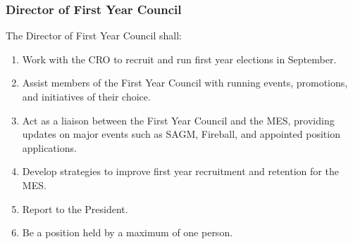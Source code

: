 
\subsubsection{Director of First Year Council}
\label{director-first-year-council}
The Director of First Year Council shall:

\begin{enumerate}
 \item
  Work with the CRO to recruit and run first year elections in September.
 \item
  Assist members of the First Year Council with running events, promotions, and initiatives of their choice.
 \item
  Act as a liaison between the First Year Council and the MES, providing updates on major events such as SAGM, Fireball, and appointed position applications.
 \item
  Develop strategies to improve first year recruitment and retention for the MES.
 \item
  Report to the President.
 \item
  Be a position held by a maximum of one person.
\end{enumerate}
